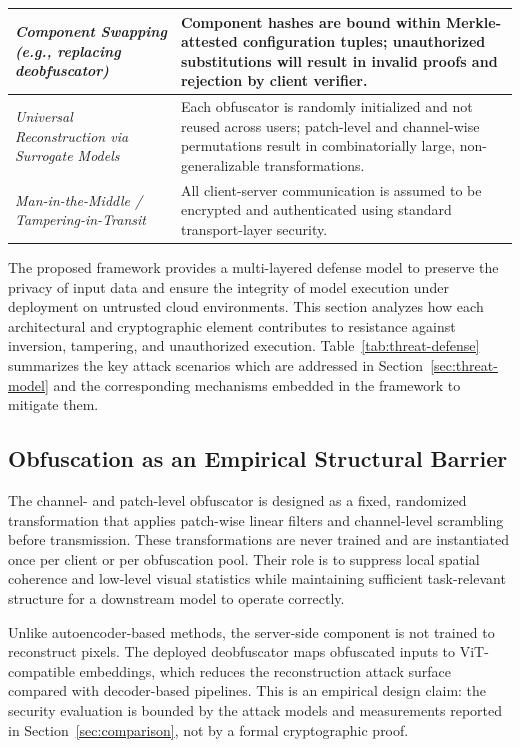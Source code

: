 \documentclass{ieeeaccess}
\newcommand{\rev}[1]{{\color{black}#1}}
\begin{document}
\begin{table}[t]
\begin{tabular}{p{} p{}}
\midrule

\textit{Component Swapping (e.g., replacing deobfuscator)} &
Component hashes are bound within Merkle-attested configuration tuples; unauthorized substitutions will result in invalid proofs and rejection by client verifier. \\

\midrule

\textit{Universal Reconstruction via Surrogate Models} &
Each obfuscator is randomly initialized and not reused across users; patch-level and channel-wise permutations result in combinatorially large, non-generalizable transformations. \\

\midrule

\textit{Man-in-the-Middle / Tampering-in-Transit} &
All client-server communication is assumed to be encrypted and authenticated using standard transport-layer security. \\

\bottomrule
\end{tabular}
\end{table}

The proposed framework provides a multi-layered defense model to preserve the privacy of input data and ensure the integrity of model execution under deployment on untrusted cloud environments. This section analyzes how each architectural and cryptographic element contributes to resistance against inversion, tampering, and unauthorized execution. Table~\ref{tab:threat-defense} summarizes the key attack scenarios which are addressed in Section~\ref{sec:threat-model} and the corresponding mechanisms embedded in the framework to mitigate them.

\subsection{\rev{Obfuscation as an Empirical Structural Barrier}}
\rev{The channel- and patch-level obfuscator is designed as a fixed, randomized transformation that applies patch-wise linear filters and channel-level scrambling before transmission. These transformations are never trained and are instantiated once per client or per obfuscation pool. Their role is to suppress local spatial coherence and low-level visual statistics while maintaining sufficient task-relevant structure for a downstream model to operate correctly.}

\rev{Unlike autoencoder-based methods, the server-side component is not trained to reconstruct pixels. The deployed deobfuscator maps obfuscated inputs to ViT-compatible embeddings, which reduces the reconstruction attack surface compared with decoder-based pipelines. This is an empirical design claim: the security evaluation is bounded by the attack models and measurements reported in Section~\ref{sec:comparison}, not by a formal cryptographic proof.}
\end{document}
